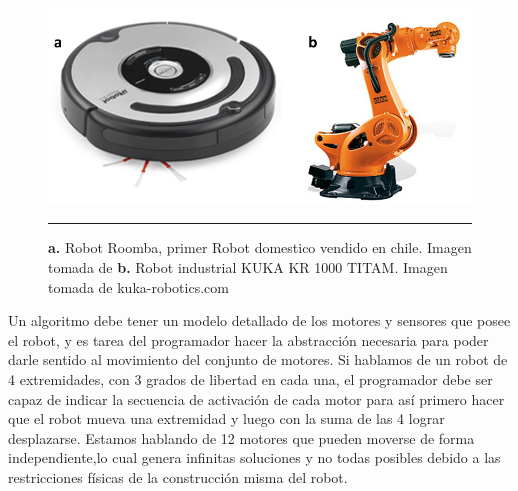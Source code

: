 \begin{figure}[htbp]
	\centering
		\includegraphics[width=\textwidth]{./Figures/RobotsInd.png}
		\rule{35em}{0.5pt}
	\caption[Robots Roomba y KUKA]{\textbf{a. }Robot Roomba, primer Robot domestico vendido en chile. Imagen tomada de \cite{Forlizzi:2006:SRD:1121241.1121286} \textbf{b.} Robot industrial KUKA KR 1000 TITAM. Imagen tomada de kuka-robotics.com}
	\label{fig:Roomba y KUKA}
\end{figure}

Un algoritmo debe tener un modelo detallado de los motores y sensores que posee el robot, y es tarea del programador hacer la abstracción necesaria para poder darle sentido al movimiento del conjunto de motores. Si hablamos de un robot de 4 extremidades, con 3 grados de libertad en cada una, el programador debe ser capaz de indicar la secuencia de activación de cada motor para así  primero hacer que el robot mueva una extremidad y luego con la suma de las 4 lograr desplazarse. Estamos hablando de 12 motores que pueden moverse de forma independiente,lo cual genera infinitas soluciones y no todas posibles debido a las restricciones físicas de la construcción misma del robot.



